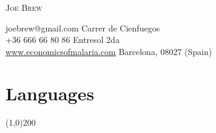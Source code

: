 \documentclass[11pt]{article}
\begin{document}


\thispagestyle{plain}
\begin{center}
\begin{Huge}
\scshape{Joe Brew}\\
\end{Huge}
joebrew@gmail.com \hfill  Carrer de Cienfuegos \\
+36 666 66 80 86 \hfill  Entresol 2da \\
\href{http://economicsofmalaria.com}{www.economicsofmalaria.com} \hfill Barcelona, 08027 (Spain)

\end{center}

\hrulefill


% 
% 
% 
% 

\section*{Languages} %
\vspace{-7mm}
\line(1,0){200}
\vspace{2mm}
\end{document}
